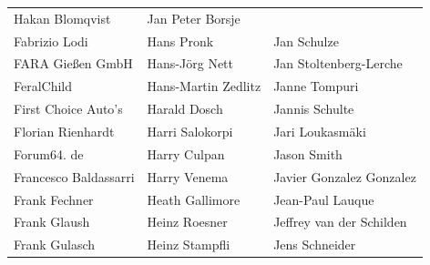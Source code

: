 \begin{small}
\begin{tabular}{p{4cm}p{4cm}p{4cm}}
Hakan Blomqvist & Jan Peter Borsje \\Fabrizio Lodi & Hans Pronk & Jan Schulze \\FARA Gießen GmbH & Hans-Jörg Nett & Jan Stoltenberg-Lerche \\FeralChild & Hans-Martin Zedlitz & Janne Tompuri \\First Choice Auto's & Harald Dosch & Jannis Schulte \\Florian Rienhardt & Harri Salokorpi & Jari Loukasmäki \\Forum64. de & Harry Culpan & Jason Smith \\Francesco Baldassarri & Harry Venema & Javier Gonzalez Gonzalez \\Frank Fechner & Heath Gallimore & Jean-Paul Lauque \\Frank Glaush & Heinz Roesner & Jeffrey van der Schilden \\Frank Gulasch & Heinz Stampfli & Jens Schneider \\
\end{tabular}
\newpage
\setlength{\tabcolsep}{1mm}
\begin{tabular}{p{4cm}p{4cm}p{4cm}}

\end{tabular}
\end{small}
